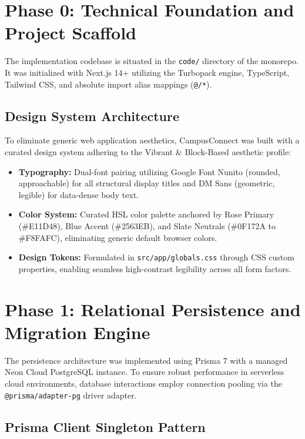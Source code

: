 \documentclass[11pt,a4paper]{report}
\begin{document}
\section{Phase 0: Technical Foundation and Project Scaffold}

The implementation codebase is situated in the \texttt{code/} directory of the monorepo. It was initialized with Next.js 14+ utilizing the Turbopack engine, TypeScript, Tailwind CSS, and absolute import alias mappings (\texttt{@/*}).

\subsection{Design System Architecture}

To eliminate generic web application aesthetics, CampusConnect was built with a curated design system adhering to the Vibrant \& Block-Based aesthetic profile:

\begin{itemize}
    \item \textbf{Typography:} Dual-font pairing utilizing Google Font Nunito (rounded, approachable) for all structural display titles and DM Sans (geometric, legible) for data-dense body text.
    \item \textbf{Color System:} Curated HSL color palette anchored by Rose Primary (\#E11D48), Blue Accent (\#2563EB), and Slate Neutrals (\#0F172A to \#F8FAFC), eliminating generic default browser colors.
    \item \textbf{Design Tokens:} Formulated in \texttt{src/app/globals.css} through CSS custom properties, enabling seamless high-contrast legibility across all form factors.
\end{itemize}

\section{Phase 1: Relational Persistence and Migration Engine}

The persistence architecture was implemented using Prisma 7 with a managed Neon Cloud PostgreSQL instance. To ensure robust performance in serverless cloud environments, database interactions employ connection pooling via the \texttt{@prisma/adapter-pg} driver adapter.

\subsection{Prisma Client Singleton Pattern}
\end{document}

